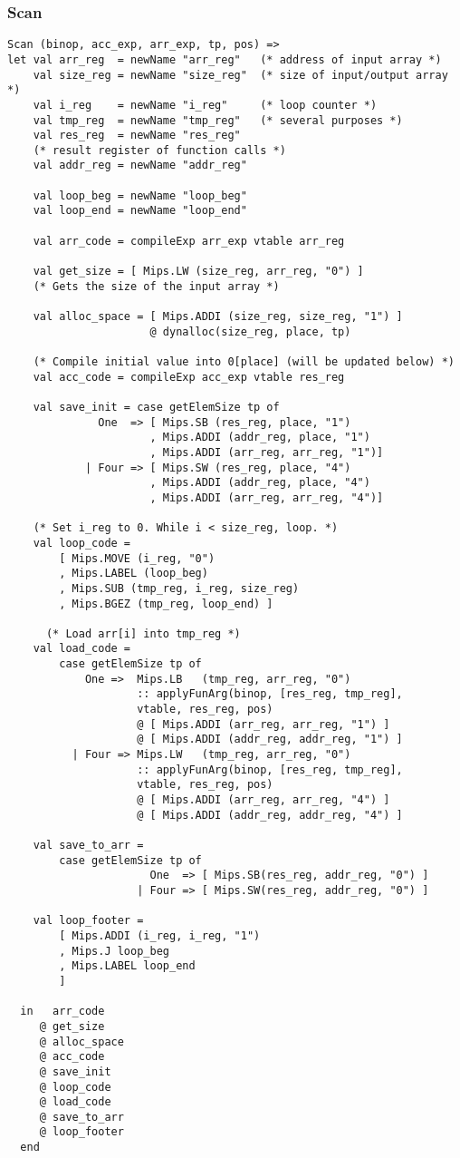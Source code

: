 \documentclass[12pt]{article}
\begin{document}
\subsubsection{Scan}
\begin{verbatim}
Scan (binop, acc_exp, arr_exp, tp, pos) =>
let val arr_reg  = newName "arr_reg"   (* address of input array *)
    val size_reg = newName "size_reg"  (* size of input/output array *)
    val i_reg    = newName "i_reg"     (* loop counter *)
    val tmp_reg  = newName "tmp_reg"   (* several purposes *)
    val res_reg  = newName "res_reg"   
    (* result register of function calls *)
    val addr_reg = newName "addr_reg"

    val loop_beg = newName "loop_beg"
    val loop_end = newName "loop_end"

    val arr_code = compileExp arr_exp vtable arr_reg

    val get_size = [ Mips.LW (size_reg, arr_reg, "0") ] 
    (* Gets the size of the input array *)

    val alloc_space = [ Mips.ADDI (size_reg, size_reg, "1") ]
                      @ dynalloc(size_reg, place, tp)

    (* Compile initial value into 0[place] (will be updated below) *)
    val acc_code = compileExp acc_exp vtable res_reg 

    val save_init = case getElemSize tp of
              One  => [ Mips.SB (res_reg, place, "1")
                      , Mips.ADDI (addr_reg, place, "1")
                      , Mips.ADDI (arr_reg, arr_reg, "1")]
            | Four => [ Mips.SW (res_reg, place, "4")
                      , Mips.ADDI (addr_reg, place, "4")
                      , Mips.ADDI (arr_reg, arr_reg, "4")]

    (* Set i_reg to 0. While i < size_reg, loop. *)
    val loop_code =
        [ Mips.MOVE (i_reg, "0")
        , Mips.LABEL (loop_beg)
        , Mips.SUB (tmp_reg, i_reg, size_reg)
        , Mips.BGEZ (tmp_reg, loop_end) ]

      (* Load arr[i] into tmp_reg *)
    val load_code =
        case getElemSize tp of
            One =>  Mips.LB   (tmp_reg, arr_reg, "0")
                    :: applyFunArg(binop, [res_reg, tmp_reg], 
                    vtable, res_reg, pos)
                    @ [ Mips.ADDI (arr_reg, arr_reg, "1") ]
                    @ [ Mips.ADDI (addr_reg, addr_reg, "1") ]
          | Four => Mips.LW   (tmp_reg, arr_reg, "0")
                    :: applyFunArg(binop, [res_reg, tmp_reg], 
                    vtable, res_reg, pos)
                    @ [ Mips.ADDI (arr_reg, arr_reg, "4") ]
                    @ [ Mips.ADDI (addr_reg, addr_reg, "4") ]

    val save_to_arr =
        case getElemSize tp of
                      One  => [ Mips.SB(res_reg, addr_reg, "0") ]
                    | Four => [ Mips.SW(res_reg, addr_reg, "0") ]

    val loop_footer =
        [ Mips.ADDI (i_reg, i_reg, "1")
        , Mips.J loop_beg
        , Mips.LABEL loop_end
        ]

  in   arr_code 
     @ get_size
     @ alloc_space
     @ acc_code 
     @ save_init
     @ loop_code 
     @ load_code 
     @ save_to_arr
     @ loop_footer
  end
\end{verbatim}
\end{document}
